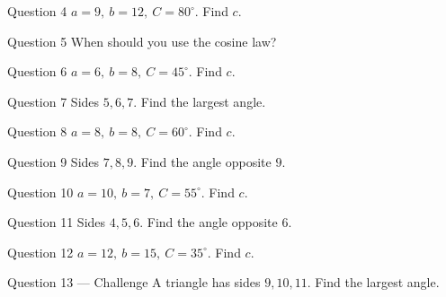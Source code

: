 \documentclass[11pt]{article}
\begin{document}
\begin{qbox}{Question 4}
$a=9,\ b=12,\ C=80^\circ$. Find $c$.\workspace{2.4cm}
\end{qbox}

\begin{qbox}{Question 5}
When should you use the cosine law?\workspace{2.4cm}
\end{qbox}

\begin{qbox}{Question 6}
$a=6,\ b=8,\ C=45^\circ$. Find $c$.\workspace{2.4cm}
\end{qbox}

\begin{qbox}{Question 7}
Sides $5,6,7$. Find the largest angle.\workspace{2.4cm}
\end{qbox}

\begin{qbox}{Question 8}
$a=8,\ b=8,\ C=60^\circ$. Find $c$.\workspace{2.4cm}
\end{qbox}

\begin{qbox}{Question 9}
Sides $7,8,9$. Find the angle opposite $9$.\workspace{2.4cm}
\end{qbox}

\begin{qbox}{Question 10}
$a=10,\ b=7,\ C=55^\circ$. Find $c$.\workspace{2.4cm}
\end{qbox}

\begin{qbox}{Question 11}
Sides $4,5,6$. Find the angle opposite $6$.\workspace{2.4cm}
\end{qbox}

\begin{qbox}{Question 12}
$a=12,\ b=15,\ C=35^\circ$. Find $c$.\workspace{2.4cm}
\end{qbox}

\begin{qbox}{Question 13 --- Challenge}
A triangle has sides $9,10,11$. Find the largest angle.\workspace{3cm}
\end{qbox}

\clearpage
{}
\end{document}
